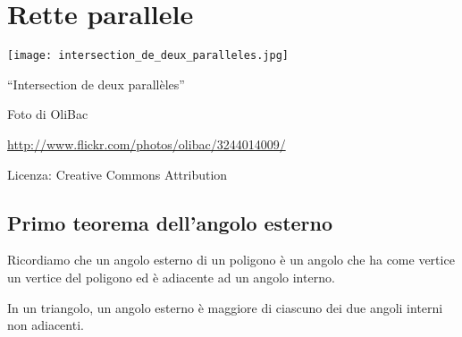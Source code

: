 \chapter{Rette parallele}

\texttt{[image: intersection\_de\_deux\_paralleles.jpg]}
  \begin{center}
    {\large ``Intersection de deux parallèles''}\par
    Foto di OliBac\par
    \url{http://www.flickr.com/photos/olibac/3244014009/}\par
    Licenza: Creative Commons Attribution\par
  \end{center}
\newpage

\section{Primo teorema dell'angolo esterno}

Ricordiamo che un angolo esterno di un poligono è un angolo che ha come vertice un vertice del poligono ed è adiacente ad un angolo interno.

\begin{teorema}
In un triangolo, un angolo esterno è maggiore di ciascuno dei due angoli interni non adiacenti.
\end{teorema}

\begin{figure}[htb]
\centering
\end{figure}

